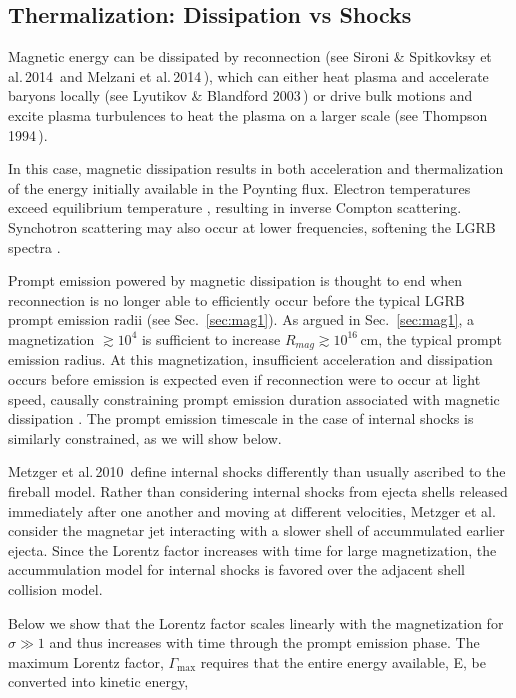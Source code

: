 \documentclass{article}
\begin{document}
\subsection{Thermalization: Dissipation vs Shocks} \label{sec:therm}

Magnetic energy can be dissipated by reconnection (see Sironi \& Spitkovksy et al.\,2014\,\cite{Sironi:2014jfa} and Melzani et al.\,2014\,\cite{Melzani:2014jsa}), which can either heat plasma and accelerate baryons locally (see Lyutikov \& Blandford 2003\,\cite{Lyutikov:2003ih}) or drive bulk motions and excite plasma turbulences to heat the plasma on a larger scale (see Thompson 1994\,\cite{Thompson:1994ap}).

In this case, magnetic dissipation results in both acceleration and thermalization of the energy initially available in the Poynting flux. Electron temperatures exceed equilibrium temperature \cite{Metzger:2010pp}, resulting in inverse Compton scattering. Synchotron scattering may also occur at lower frequencies, softening the LGRB spectra \cite{Metzger:2010pp}.

Prompt emission powered by magnetic dissipation is thought to end when reconnection is no longer able to efficiently occur before the typical LGRB prompt emission radii (see Sec.~\ref{sec:mag1}). As argued in Sec.~\ref{sec:mag1}, a magnetization $\gtrsim 10^4$ is sufficient to increase $R_{mag} \gtrsim 10^{16}$\,cm, the typical prompt emission radius. At this magnetization, insufficient acceleration and dissipation occurs before emission is expected even if reconnection were to occur at light speed, causally constraining prompt emission duration associated with magnetic dissipation \cite{Lyubarsky:2000yn}. The prompt emission timescale in the case of internal shocks is similarly constrained, as we will show below.

Metzger et al.\,2010\,\cite{Metzger:2010pp} define internal shocks differently than usually ascribed to the fireball model. Rather than considering internal shocks from ejecta shells released immediately after one another and moving at different velocities, Metzger et al. consider the magnetar jet interacting with a slower shell of accummulated earlier ejecta. Since the Lorentz factor increases with time for large magnetization, the accummulation model for internal shocks is favored over the adjacent shell collision model.

Below we show that the Lorentz factor scales linearly with the magnetization for $\sigma \gg 1$ and thus increases with time through the prompt emission phase.
The maximum Lorentz factor, $\Gamma_{\mathrm{max}}$ requires that the entire energy available, E, be converted into kinetic energy,
\end{document}
